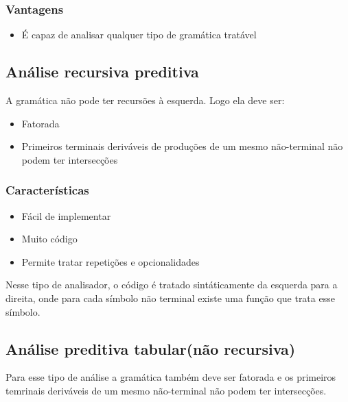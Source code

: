 \documentclass[11pt]{article}
\begin{document}
\subsubsection{Vantagens}
\label{sec:orgdef5e7d}
\begin{itemize}
\item É capaz de analisar qualquer tipo de gramática tratável
\end{itemize}

\subsection{Análise recursiva preditiva}
\label{sec:org7674257}
A gramática não pode ter recursões à esquerda. Logo ela deve ser:
\begin{itemize}
\item Fatorada
\item Primeiros terminais deriváveis de produções de um mesmo
não-terminal não podem ter intersecções
\end{itemize}

\subsubsection{Características}
\label{sec:org7ca3028}
\begin{itemize}
\item Fácil de implementar
\item Muito código
\item Permite tratar repetições e opcionalidades
\end{itemize}

Nesse tipo de analisador, o código é tratado sintáticamente da
esquerda para a direita, onde para cada símbolo não terminal existe
uma função que trata esse símbolo.

\subsection{Análise preditiva tabular(não recursiva)}
\label{sec:org316093c}
Para esse tipo de análise a gramática também deve ser fatorada e os
primeiros temrinais deriváveis de um mesmo não-terminal não podem
ter intersecções.
\end{document}
